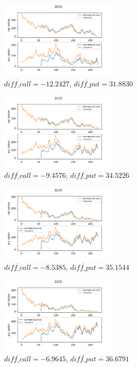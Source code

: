 \documentclass[sigconf]{acmart}
\begin{document}
\begin{figure}[htbp]
    \centering
    \includegraphics[width=0.5\textwidth]{15.png}
    \caption{\label{}$\overline{diff\_call}=-12.2427$, $\overline{diff\_put}=31.8830$}
\end{figure}

\begin{figure}[htbp]
    \centering
    \includegraphics[width=0.5\textwidth]{16.png}
    \caption{\label{}$\overline{diff\_call}=-9.4576$, $\overline{diff\_put}=34.5226$}
\end{figure}

\begin{figure}[htbp]
    \centering
    \includegraphics[width=0.5\textwidth]{17.png}
    \caption{\label{}$\overline{diff\_call}=-8.5385$, $\overline{diff\_put}=35.1544$}
\end{figure}

\begin{figure}[htbp]
    \centering
    \includegraphics[width=0.5\textwidth]{18.png}
    \caption{\label{}$\overline{diff\_call}=-6.9645$, $\overline{diff\_put}=36.6791$}
\end{figure}
\end{document}
